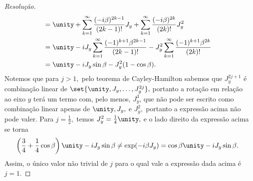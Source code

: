 \begin{proof}[Resolução]
\begin{align*}
        &= \unity + \sum_{k = 1}^{\infty} \frac{(-i \beta)^{2k - 1}}{(2k - 1)!}J_y + \sum_{k = 1}^{\infty} \frac{(-i \beta)^{2k}}{(2k)!} J_y^2\\
        &= \unity - i J_y \sum_{k = 1}^\infty \frac{(-1)^{k+1} \beta^{2k - 1}}{(2k -1)!} - J_y^2\sum_{k = 1}^\infty \frac{(-1)^{k+1} \beta^{2k}}{(2k)!}\\
        &= \unity - i J_y \sin \beta - J_y^2 (1 - \cos\beta).
    \end{align*}
    Notemos que para \(j > 1,\) pelo teorema de Cayley-Hamilton sabemos que \(J_y^{2j+1}\) é combinação linear de \(\set{\unity, J_y, \dots, J_y^{2j}},\) portanto a rotação em relação ao eixo \(y\) terá um termo com, pelo menos, \(J_y^3\), que não pode ser escrito como combinação linear apenas de \(\unity, J_y,\) e \(J_y^2,\) portanto a expressão acima não pode valer. Para \(j = \frac12,\) temos \(J_y^2 = \frac14 \unity,\) e o lado direito da expressão acima se torna
    \begin{equation*}
        \left(\frac{3}{4} + \frac14 \cos\beta\right)\unity - i J_y \sin\beta \neq \exp(-i \beta J_y) = \cos \beta \unity - i J_y \sin\beta.
    \end{equation*}
    Assim, o único valor não trivial de \(j\) para o qual vale a expressão dada acima é \(j = 1.\)
\end{proof}

